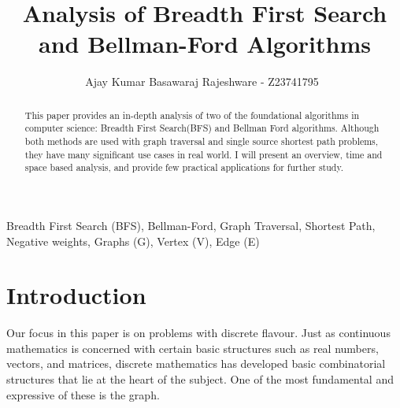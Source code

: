 \documentclass[lettersize,journal]{IEEEtran}
\begin{document}
\title{Analysis of Breadth First Search and Bellman-Ford Algorithms}

\author{Ajay Kumar Basawaraj Rajeshware - Z23741795~\IEEEmembership{}
}



\maketitle

\begin{abstract}
This paper provides an in-depth analysis of two of the foundational algorithms in computer science: Breadth First Search(BFS) and Bellman Ford algorithms. Although both methods are used with graph traversal and single source shortest path problems, they have many significant use cases in real world. I will present an overview, time and space based analysis, and provide few practical applications for further study.


\end{abstract}

\begin{IEEEkeywords}
Breadth First Search (BFS), Bellman-Ford, Graph Traversal, Shortest Path, Negative weights, Graphs (G), Vertex (V), Edge (E)
\end{IEEEkeywords}

\section{Introduction}
Our focus in this paper is on problems with discrete flavour. Just as continuous mathematics is concerned with certain basic structures such as real numbers, vectors, and matrices, discrete mathematics has developed basic combinatorial structures that lie at the heart of the subject. One of the most fundamental and expressive of these is the graph\cite{kleinberg2005algorithm}. 
\end{document}
